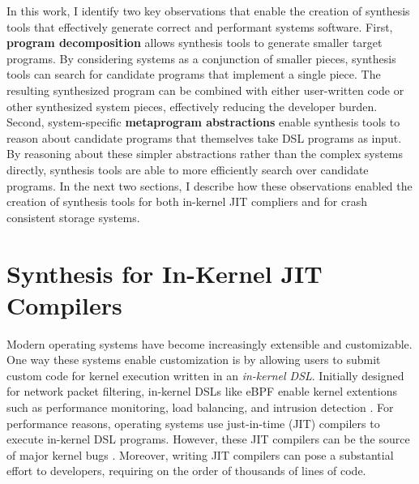 In this work, I identify two key observations that enable the creation of synthesis tools
that effectively generate correct and performant systems software.
First, \textbf{program decomposition} allows synthesis tools to generate smaller target programs.
By considering systems as a conjunction of smaller pieces,
synthesis tools can search for candidate programs that implement a single piece.
The resulting synthesized program can be combined with either user-written code or
other synthesized system pieces, effectively reducing the developer burden.
Second, system-specific \textbf{metaprogram abstractions} enable synthesis tools to reason 
about candidate programs that themselves take DSL programs as input.
By reasoning about these simpler abstractions rather than the complex systems directly,
synthesis tools are able to more efficiently search over candidate programs.
In the next two sections, I describe how these observations enabled the creation of
synthesis tools for both in-kernel JIT compliers and for crash consistent storage systems.

\fi


\section{Synthesis for In-Kernel JIT Compilers}
Modern operating systems have become increasingly extensible and customizable.
One way these systems enable customization is by
allowing users to submit custom code for kernel execution
written in an \textit{in-kernel DSL}.
Initially designed for network packet filtering, 
in-kernel DSLs like eBPF \cite{fleming:ebpf} enable kernel extentions
such as performance monitoring, load balancing, and intrusion detection
\cite{engler:vcode,fleming:ebpf,mccanne:bpf}.
For performance reasons, operating systems use just-in-time (JIT) compilers
to execute in-kernel DSL programs.
However,
these JIT compilers can be the source of major kernel bugs
\cite{gpz:1454,paul:cve-2020-8835,blazakis:jit-spraying,kocher:spectre}.
Moreover, writing JIT compilers can pose a substantial effort to developers,
requiring on the order of thousands of lines of code.

